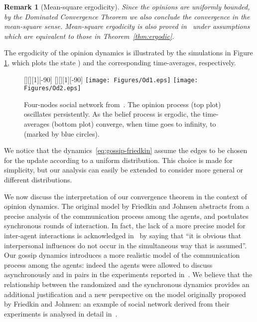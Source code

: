 \documentclass{IEEEtran}
\newtheorem{remark}{Remark}
\newcommand{\1}{\mathbf{1}} \newcommand{\ind}{\mathds{1}}
\begin{document}
\begin{remark}[Mean-square ergodicity]
Since the opinions are uniformly bounded, by the Dominated Convergence Theorem we  also conclude the convergence in the 
mean-square sense. Mean-square ergodicity is also proved in~\cite{PF-CR-RT-HI:13c} under assumptions which are equivalent to those in Theorem~\ref{thm:ergodic}.
\end{remark}
The ergodicity of the opinion dynamics is illustrated by the simulations in
Figure \ref{fig:simul-od}, which plots the state ) and the
corresponding time-averages, respectively.
\begin{figure}[t]
\begin{center}
[][][1][-90]{}
[][][1][-90]{}
\texttt{[image: Figures/Od1.eps]}
\texttt{[image: Figures/Od2.eps]}
\caption{Four-nodes social network from~\cite{NEF-ECJ:99}. The opinion process
 (top plot) oscillates persistently. As the belief process is ergodic, the time-averages  (bottom plot) converge, when time goes to
infinity, to  (marked by blue circles).}
\label{fig:simul-od}
\end{center}
\end{figure}

We notice that the dynamics~\eqref{eq:gossip-friedkin} assume the edges to be chosen for the update according to a uniform distribution. This choice is made for simplicity, but our analysis can easily be extended to consider more general or different distributions.


We now discuss the interpretation of our convergence theorem in the
context of opinion dynamics. The original model by Friedkin and Johnsen abstracts from a precise analysis of the communication process among the agents, and postulates synchronous rounds of interaction. In fact, the lack of a more precise model for inter-agent interactions is acknowledged in~\cite{NEF-ECJ:99} by saying that ``it is obvious that interpersonal influences do not occur in the simultaneous way that is assumed''.
Our gossip dynamics introduces a more realistic model of  the communication process among the agents: indeed the agents were allowed to discuss asynchronously and in pairs in the experiments reported in~\cite{NEF-ECJ:99}. 
We believe that the relationship between the randomized and the synchronous dynamics provides an additional justification and a new perspective on the model originally proposed by Friedkin and Johnsen: an example of social network derived from their experiments is analysed in detail in~\cite{PF-CR-RT-HI:13c}.
\end{document}
